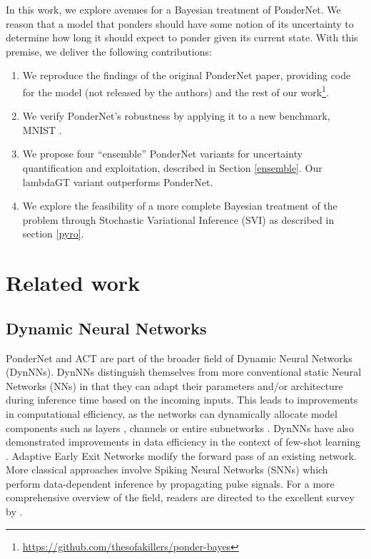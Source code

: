 \documentclass{article}
\begin{document}
In this work, we explore avenues for a Bayesian treatment of PonderNet. We reason that a model that ponders should have some notion of its uncertainty to determine how long it should expect to ponder given its current state. With this premise, we deliver the following contributions:
\begin{enumerate}
    \item We reproduce the findings of the original PonderNet paper, providing code for the model (not released by the authors) and the rest of our work\footnote{\label{note1}\href{https://github.com/thesofakillers/ponder-bayes}{https://github.com/thesofakillers/ponder-bayes}}.
    \item We verify PonderNet's robustness by applying it to a new benchmark, MNIST \cite{deng_mnist_2012}.
    \item We propose four ``ensemble'' PonderNet variants for uncertainty quantification and exploitation, described in Section \ref{ensemble}. Our lambdaGT variant outperforms PonderNet.
    \item We explore the feasibility of a more complete Bayesian treatment of the problem through Stochastic Variational Inference (SVI) as described in section \ref{pyro}.
\end{enumerate}

\section{Related work} \label{related-work}

\subsection{Dynamic Neural Networks}
PonderNet and ACT are part of the broader field of Dynamic Neural Networks (DynNNs). DynNNs distinguish themselves from more conventional static Neural Networks (NNs) in that they can adapt their parameters and/or architecture during inference time based on the incoming inputs. This leads to improvements in computational efficiency, as the networks can dynamically allocate model components such as layers \citep{huang_multi-scale_2018}, channels \citep{lin_runtime_2017} or entire subnetworks \citep{shazeer_outrageously_2016}. DynNNs have also demonstrated improvements in data efficiency in the context of few-shot learning \citep{bertinetto_learning_2016-1, wang_tafe-net_2019}. Adaptive Early Exit Networks \citep{bolukbasi_adaptive_2017} modify the forward pass of an existing network. More classical approaches involve Spiking Neural Networks (SNNs) \citep{maass_networks_1997, izhikevich_simple_2003} which perform data-dependent inference by propagating pulse signals. For a more comprehensive overview of the field, readers are directed to the excellent survey by \citet{han_dynamic_2021-1}.
\end{document}
